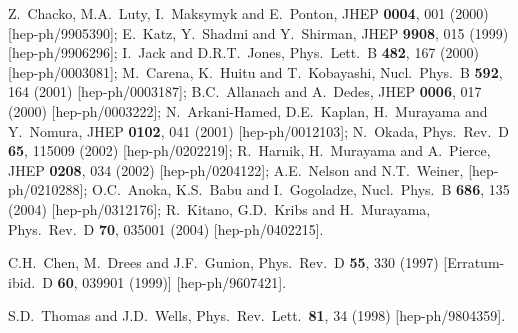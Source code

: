 \documentclass[12pt]{article}
\begin{document}
\begin{thebibliography}{999}
Z.~Chacko, M.A.~Luty, I.~Maksymyk and E.~Ponton,
  JHEP {\bf 0004}, 001 (2000)
  [hep-ph/9905390];
E.~Katz, Y.~Shadmi and Y.~Shirman,
  JHEP {\bf 9908}, 015 (1999)
  [hep-ph/9906296];
I.~Jack and D.R.T.~Jones,
  Phys.\ Lett.\ B {\bf 482}, 167 (2000)
  [hep-ph/0003081];
M.~Carena, K.~Huitu and T.~Kobayashi,
  Nucl.\ Phys.\ B {\bf 592}, 164 (2001)
  [hep-ph/0003187];
B.C.~Allanach and A.~Dedes,
  JHEP {\bf 0006}, 017 (2000)
  [hep-ph/0003222];
N.~Arkani-Hamed, D.E.~Kaplan, H.~Murayama and Y.~Nomura,
  JHEP {\bf 0102}, 041 (2001)
  [hep-ph/0012103];
N.~Okada,
  Phys.\ Rev.\ D {\bf 65}, 115009 (2002)
  [hep-ph/0202219];
R.~Harnik, H.~Murayama and A.~Pierce,
  JHEP {\bf 0208}, 034 (2002)
  [hep-ph/0204122];
A.E.~Nelson and N.T.~Weiner,
  [hep-ph/0210288];
O.C.~Anoka, K.S.~Babu and I.~Gogoladze,
  Nucl.\ Phys.\ B {\bf 686}, 135 (2004)
  [hep-ph/0312176];
R.~Kitano, G.D.~Kribs and H.~Murayama,
  Phys.\ Rev.\ D {\bf 70}, 035001 (2004)
  [hep-ph/0402215].

C.H.~Chen, M.~Drees and J.F.~Gunion,
  Phys.\ Rev.\ D {\bf 55}, 330 (1997)
  [Erratum-ibid.\ D {\bf 60}, 039901 (1999)]
  [hep-ph/9607421].

  S.D.~Thomas and J.D.~Wells,
  Phys.\ Rev.\ Lett.\  {\bf 81}, 34 (1998)
  [hep-ph/9804359].
  

\end{thebibliography}
\end{document}
